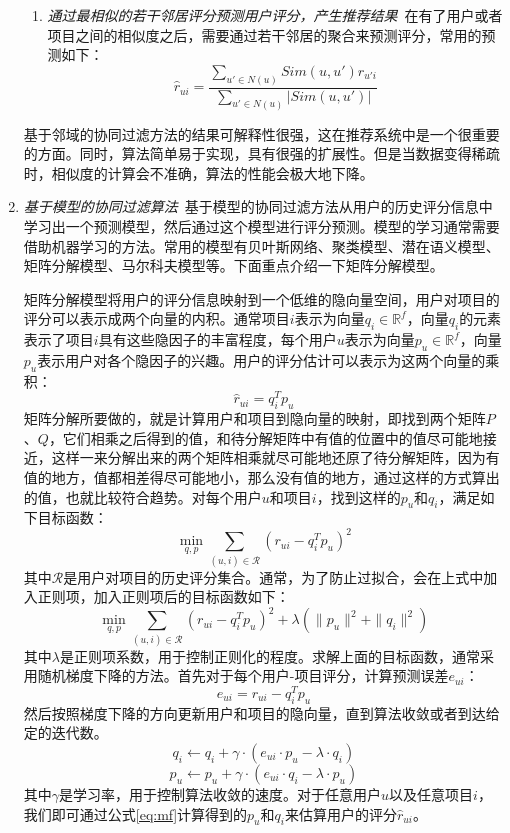 \documentclass[master,winfonts]{njuthesis}
\begin{document}
\begin{enumerate}
\begin{enumerate}
\item \emph{通过最相似的若干邻居评分预测用户评分，产生推荐结果}~在有了用户或者项目之间的相似度之后，需要通过若干邻居的聚合来预测评分，常用的预测如下：
\begin{equation}
\hat{r}_{ui}=\frac{\sum\limits_{{u}'\in N(u)}Sim(u,{u}')r_{{u}'i}}{\sum\limits_{{u}'\in N(u)}\left | Sim(u,{u}') \right |}
\end{equation}
\end{enumerate}
基于邻域的协同过滤方法的结果可解释性很强，这在推荐系统中是一个很重要的方面。同时，算法简单易于实现，具有很强的扩展性。但是当数据变得稀疏时，相似度的计算会不准确，算法的性能会极大地下降。

\item \emph{基于模型的协同过滤算法}~基于模型的协同过滤方法从用户的历史评分信息中学习出一个预测模型，然后通过这个模型进行评分预测。模型的学习通常需要借助机器学习的方法。常用的模型有贝叶斯网络、聚类模型、潜在语义模型、矩阵分解模型、马尔科夫模型等。下面重点介绍一下矩阵分解模型。

矩阵分解模型将用户的评分信息映射到一个低维的隐向量空间，用户对项目的评分可以表示成两个向量的内积。通常项目$i$表示为向量$q_i\in\mathbb{R}^f$，向量$q_i$的元素表示了项目$i$具有这些隐因子的丰富程度，每个用户$u$表示为向量$p_u\in\mathbb{R}^f$，向量$p_u$表示用户对各个隐因子的兴趣。用户的评分估计可以表示为这两个向量的乘积：
\begin{equation}
\hat{r}_{ui}=q_i^Tp_u\label{eq:mf}
\end{equation}
矩阵分解所要做的，就是计算用户和项目到隐向量的映射，即找到两个矩阵$P$、$Q$，它们相乘之后得到的值，和待分解矩阵中有值的位置中的值尽可能地接近，这样一来分解出来的两个矩阵相乘就尽可能地还原了待分解矩阵，因为有值的地方，值都相差得尽可能地小，那么没有值的地方，通过这样的方式算出的值，也就比较符合趋势。对每个用户$u$和项目$i$，找到这样的$p_u$和$q_i$，满足如下目标函数：
\begin{equation}
\min_{q, p}\sum_{(u,i)\in\mathcal{R}}(r_{ui}-q_i^Tp_u)^2 
\end{equation}
其中$\mathcal{R}$是用户对项目的历史评分集合。通常，为了防止过拟合，会在上式中加入正则项，加入正则项后的目标函数如下：
\begin{equation}
\min_{q, p}\sum_{(u,i)\in\mathcal{R}}(r_{ui}-q_i^Tp_u)^2 + \lambda(\|p_u\|^2 + \|q_i\|^2)
\end{equation}
其中$\lambda$是正则项系数，用于控制正则化的程度。求解上面的目标函数，通常采用随机梯度下降的方法。首先对于每个用户-项目评分，计算预测误差$e_{ui}$：
\begin{equation}
e_{ui} = r_{ui} - q_i^Tp_u
\end{equation}
然后按照梯度下降的方向更新用户和项目的隐向量，直到算法收敛或者到达给定的迭代数。
\begin{equation}
q_i \leftarrow q_i + \gamma\cdot(e_{ui}\cdot p_{u}-\lambda\cdot q_i)
\end{equation}
\begin{equation}
p_u \leftarrow p_u + \gamma\cdot(e_{ui}\cdot q_{i}-\lambda\cdot p_u)
\end{equation}
其中$\gamma$是学习率，用于控制算法收敛的速度。对于任意用户$u$以及任意项目$i$，我们即可通过公式\eqref{eq:mf}计算得到的$p_u$和$q_i$来估算用户的评分$\hat{r}_{ui}$。


\end{enumerate}
\end{document}
